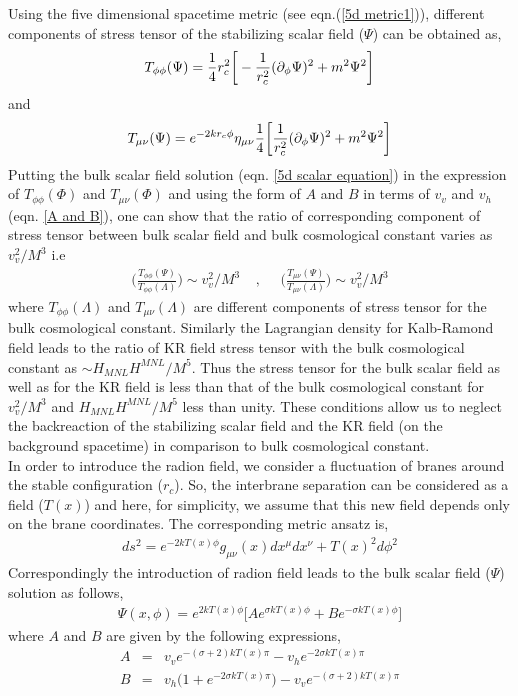 \documentclass[a4paper]{article}
\begin{document}
Using the five dimensional spacetime metric (see eqn.(\ref{5d metric1})), different components of stress 
 tensor of the stabilizing scalar field ($\Psi$) can be obtained as,
 \begin{equation}
  T_{\phi\phi}(\Psi) = \frac{1}{4}r_c^2\bigg[-\frac{1}{r_c^2}(\partial_\phi\Psi)^2 + m^2\Psi^2\bigg]
  \nonumber\\
 \end{equation}
 and 
 \begin{equation}
  T_{\mu\nu}(\Psi) = e^{-2kr_c\phi}\eta_{\mu\nu}\frac{1}{4}\bigg[\frac{1}{r_c^2}(\partial_\phi\Psi)^2 + m^2\Psi^2\bigg]
  \nonumber\\
 \end{equation}
 Putting the bulk scalar field solution (eqn. \ref{5d scalar equation}) in the expression of $T_{\phi\phi}(\Phi)$ and $T_{\mu\nu}(\Phi)$ and 
 using the form of $A$ and $B$ in terms of $v_v$ and $v_h$ (eqn. \ref{A and B}), one can show that 
 the ratio of corresponding component of stress tensor between bulk scalar field and bulk cosmological 
 constant varies as $v_v^2/M^3$ i.e 
 \begin{eqnarray}
 \bigg(\frac{T_{\phi\phi}(\Psi)}{T_{\phi\phi}(\Lambda)}\bigg) \sim v_v^2/M^3~~~~~,~~~~~~ 
 \bigg(\frac{T_{\mu\nu}(\Psi)}{T_{\mu\nu}(\Lambda)}\bigg) \sim v_v^2/M^3
 \nonumber
 \end{eqnarray}
 where $T_{\phi\phi}(\Lambda)$ and $T_{\mu\nu}(\Lambda)$ are different components of stress tensor for the bulk cosmological 
 constant. Similarly the Lagrangian density for Kalb-Ramond field leads to the ratio of KR field stress tensor with the bulk cosmological constant as 
 $\sim H_{MNL}H^{MNL}/M^5$. Thus the stress tensor 
 for the bulk scalar field as well as for the KR field is less than that of the bulk cosmological constant for $v_v^2/M^3$ and 
 $H_{MNL}H^{MNL}/M^5$ less than unity. These conditions allow us to neglect the backreaction of the stabilizing scalar field 
 and the KR field (on the background spacetime) in comparison to bulk cosmological constant.\\
In order to introduce the radion field, we consider a fluctuation of branes around the stable configuration ($r_c$). 
So, the interbrane separation can be considered as a field ($T(x)$) and here, for simplicity, we assume that this new field 
depends only on the brane coordinates. The corresponding metric ansatz is,
\begin{eqnarray}
 ds^2 = e^{-2kT(x)\phi}g_{\mu\nu}(x) dx^{\mu}dx^{\nu} + T(x)^2d\phi^2
 \label{5d metric2}
\end{eqnarray}
Correspondingly the introduction of radion field leads to the bulk scalar field ($\Psi$) solution as follows,
\begin{eqnarray}
 \Psi(x,\phi) = e^{2kT(x)\phi} \bigg[Ae^{\sigma kT(x)\phi} + Be^{-\sigma kT(x)\phi}\bigg]
 \label{5d scalar solution2}
\end{eqnarray}
where $A$ and $B$ are given by the following expressions,
\begin{eqnarray}
 A&=&v_v e^{-(\sigma+2)kT(x)\pi} - v_h e^{-2\sigma kT(x)\pi}\nonumber\\
 B&=&v_h\big(1 + e^{-2\sigma kT(x)\pi}\big) - v_v e^{-(\sigma+2)kT(x)\pi}
 \nonumber
\end{eqnarray}
\end{document}
